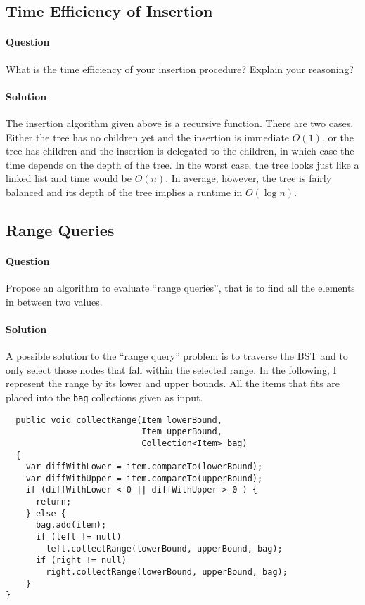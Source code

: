 \documentclass{article}
\begin{document}
\subsection{Time Efficiency of Insertion}
\paragraph{Question} What is the time efficiency of your insertion
procedure? Explain your reasoning?

\paragraph{Solution} The insertion algorithm given above is a
recursive function. There are two cases. Either the tree has no
children yet and the insertion is immediate $O(1)$, or the tree has
children and the insertion is delegated to the children, in which case
the time depends on the depth of the tree. In the worst case, the tree
looks just like a linked list and time would be $O(n)$.  In average,
however, the tree is fairly balanced and its depth of the tree implies
a runtime in $O(\log n)$.

\subsection{Range Queries}

\paragraph{Question} Propose an algorithm to evaluate ``range
queries'', that is to find all the elements in between two values.

\paragraph{Solution} A possible solution to the ``range query''
problem is to traverse the BST and to only select those nodes that
fall within the selected range. In the following, I represent the
range by its lower and upper bounds. All the items that fits are
placed into the \texttt{bag} collections given as input.

\begin{verbatim}
  public void collectRange(Item lowerBound,
                           Item upperBound,
                           Collection<Item> bag)
  {
    var diffWithLower = item.compareTo(lowerBound);
    var diffWithUpper = item.compareTo(upperBound);
    if (diffWithLower < 0 || diffWithUpper > 0 ) {
      return;
    } else {
      bag.add(item);
      if (left != null)
        left.collectRange(lowerBound, upperBound, bag);
      if (right != null)
        right.collectRange(lowerBound, upperBound, bag);
    }
}
\end{verbatim}
\end{document}
